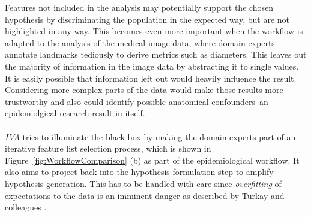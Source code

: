 \documentclass[journal]{style/vgtc} 			          %
\begin{document}
%
%
Features not included in the analysis may potentially support the chosen hypothesis by discriminating the population in the expected way, but are not highlighted in any way.
%
This becomes even more important when the workflow is adapted to the analysis of the medical image data, where
domain experts annotate landmarks tediously to derive metrics such as diameters. %
%
This leaves out the majority of information in the image data by abstracting it to single values.
%
It is easily possible that information left out would heavily influence the result.
%
Considering more complex parts of the data would make those results more trustworthy and also could identify possible anatomical confounders--an epidemiolgical research result in itself.
\\\\
\emph{IVA} tries to illuminate the black box by making the domain experts part of an iterative feature list selection process, which is shown in Figure~\ref{fig:WorkflowComparison} (b) as part of the epidemiological workflow.
%
%
It also aims to project back into the hypothesis formulation step to amplify hypothesis generation.
%
This has to be handled with care since \emph{overfitting} of expectations to the data is an imminent danger as described by Turkay and colleagues \cite{Turkay2013}.
\end{document}
